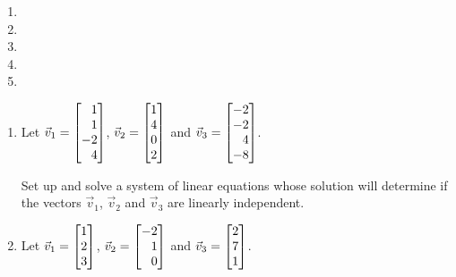 \begin{exercises}
\begin{problist}
\begin{enumerate}
			\item {}

			\item {}

			\item {}

			\item {}

			\item {}
		\end{enumerate}

		\prob 
		\label{QSETUPEQUATIONS}
		\begin{enumerate}
			\item Let $\vec v_{1}=\mat{1\\1\\-2\\4}$,
			$\vec v_{2}=\mat{1\\4\\0\\2}$ and
			$\vec v_{3}=\mat{-2\\-2\\4\\-8}$.
			
			Set up and solve a system of linear equations whose solution
			will determine if the vectors $\vec v_{1}$, $\vec v_{2}$ and $\vec
			v_{3}$ are linearly independent.
			
			\item Let $\vec v_{1}=\mat{1\\2\\3}$, $\vec v_{2}=\mat{-2\\1\\0}$
			and $\vec v_{3}=\mat{2\\7\\1}$.
			

\end{enumerate}
\end{problist}
\end{exercises}
